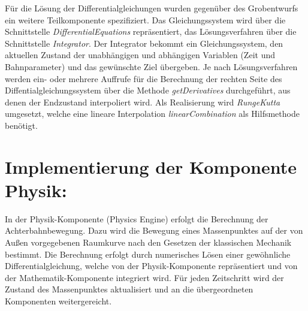 Für die Lösung der Differentialgleichungen wurden gegenüber des Grobentwurfs ein
weitere Teilkomponente spezifiziert. Das Gleichungssystem wird über die Schnittstelle
\emph{DifferentialEquations} repräsentiert, das Lösungsverfahren über die Schnittstelle
\emph{Integrator}. Der Integrator bekommt ein Gleichungssystem, den aktuellen Zustand
der unabhängigen und abhängigen Variablen (Zeit und Bahnparameter) und das gewünschte
Ziel übergeben. Je nach Lösungsverfahren werden ein- oder mehrere Auffrufe für die
Berechnung der rechten Seite des Diffentialgleichungssystem über die Methode 
\emph{getDerivatives} durchgeführt, aus denen der Endzustand interpoliert wird.
Als Realisierung wird \emph{RungeKutta} umgesetzt, welche eine lineare Interpolation
\emph{linearCombination} als Hilfsmethode benötigt.

\section{Implementierung der Komponente Physik:}

In der Physik-Komponente (Physics Engine) erfolgt die Berechnung der Achterbahnbewegung.
Dazu wird die Bewegung eines Massenpunktes auf der von Außen vorgegebenen Raumkurve
nach den Gesetzen der klassischen Mechanik bestimmt. Die Berechnung erfolgt
durch numerisches Lösen einer gewöhnliche Differentialgleichung, welche von der
Physik-Komponente repräsentiert und von der Mathematik-Komponente integriert wird.
Für jeden Zeitschritt wird der Zustand des Massenpunktes aktualisiert und an die
übergeordneten Komponenten weitergereicht.

